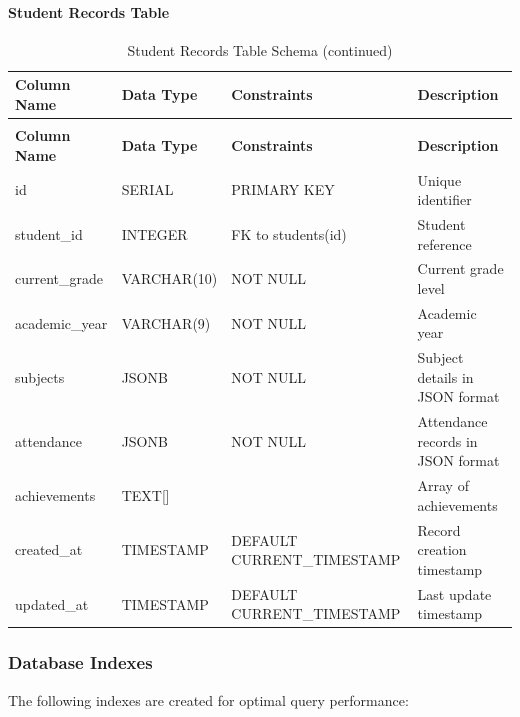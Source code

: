 \documentclass[12pt,a4paper]{report}
\begin{document}
\paragraph{Student Records Table}
\begin{longtable}{|p{3cm}|p{3cm}|p{2cm}|p{6cm}|}
\caption{Student Records Table Schema}
\label{tab:student-records}\\
\hline
\textbf{Column Name} & \textbf{Data Type} & \textbf{Constraints} & \textbf{Description} \\
\hline
\endfirsthead
\caption[]{Student Records Table Schema (continued)}\\
\hline
\textbf{Column Name} & \textbf{Data Type} & \textbf{Constraints} & \textbf{Description} \\
\hline
\endhead
id & SERIAL & PRIMARY KEY & Unique identifier \\
\hline
student\_id & INTEGER & FK to students(id) & Student reference \\
\hline
current\_grade & VARCHAR(10) & NOT NULL & Current grade level \\
\hline
academic\_year & VARCHAR(9) & NOT NULL & Academic year \\
\hline
subjects & JSONB & NOT NULL & Subject details in JSON format \\
\hline
attendance & JSONB & NOT NULL & Attendance records in JSON format \\
\hline
achievements & TEXT[] & & Array of achievements \\
\hline
created\_at & TIMESTAMP & DEFAULT CURRENT\_TIMESTAMP & Record creation timestamp \\
\hline
updated\_at & TIMESTAMP & DEFAULT CURRENT\_TIMESTAMP & Last update timestamp \\
\hline
\end{longtable}

\subsubsection{Database Indexes}

The following indexes are created for optimal query performance:
\end{document}
